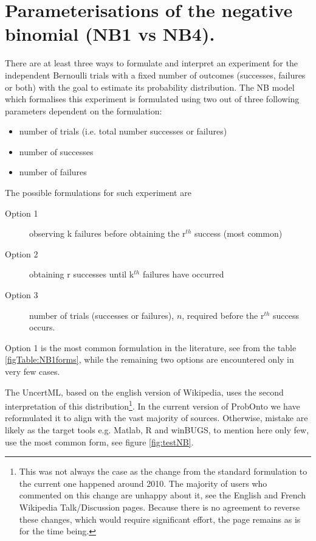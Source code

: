 \newpage
\section{Parameterisations of the negative binomial (NB1 vs NB4).}
\label{app:sec:NB1discussion}

There are at least three ways to formulate and interpret an experiment for 
the independent Bernoulli trials with a fixed number of outcomes (successes,
failures or both) with the goal to estimate its probability distribution. 
The NB model which formalises this experiment is formulated using two 
out of three following parameters dependent on the formulation: 
\begin{itemize}
\item 
number of trials (i.e. total number successes or failures) %
\item
number of successes %
\item
number of failures %
\end{itemize} 
The possible formulations for such experiment are 
\begin{description}
\item[Option 1]
observing k failures before obtaining the r$^{th}$ success (most common)
\item[Option 2]
obtaining r successes until k$^{th}$ failures have occurred
\item[Option 3]
number of trials (successes or failures), $n$, required before the r$^{th}$ success occurs.
\end{description}
Option 1 is the most common formulation in the literature, see from the table \ref{figTable:NB1forms}, 
while the remaining two options are encountered only in very few cases.

The UncertML, based on the english version of Wikipedia, uses the second 
interpretation of this distribution\footnote{This was not always the case as the change 
from the standard formulation to the current one happened around 2010. The majority 
of users who commented on this change are unhappy about it, see the English and French 
Wikipedia Talk/Discussion pages. 
Because there is no agreement to reverse these changes, which would require 
significant effort, the page remains as is for the time being.}. In the current version 
of ProbOnto we have reformulated it to align with the vast majority of sources. 
Otherwise, mistake are likely as the target tools e.g. Matlab, R and 
winBUGS, to mention here only few, use the most common form, see figure 
\ref{fig:testNB}.

